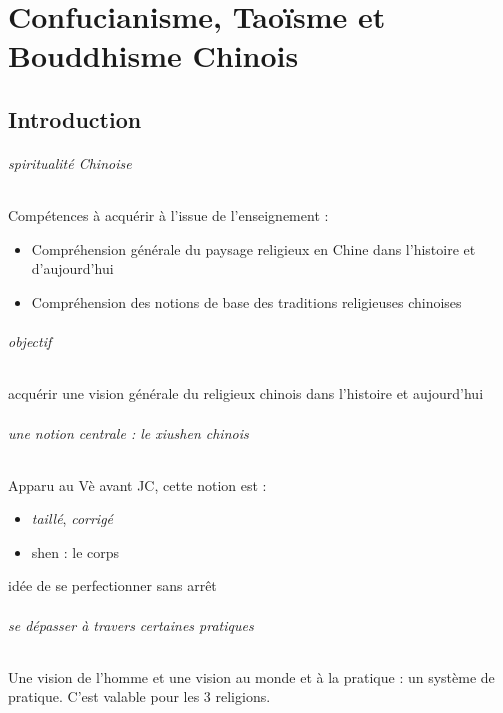 \part{Confucianisme, Taoïsme et Bouddhisme Chinois}
\chapter{Introduction}


\paragraph{spiritualité Chinoise}
Compétences à acquérir à l’issue de l’enseignement :
\begin{itemize}
    \item 	Compréhension générale du paysage religieux en Chine dans l’histoire et d’aujourd’hui
\item 	Compréhension des notions de base des traditions religieuses chinoises
\end{itemize}


\paragraph{objectif } acquérir une vision générale du religieux chinois dans l'histoire et aujourd'hui


\paragraph{une notion centrale : le xiushen chinois}

\begin{Def}[xiushen]
    Apparu au Vè avant JC, cette notion est :
    \begin{itemize}
        \item \textit{taillé}, \textit{corrigé}
        \item shen : le corps
    \end{itemize}
    idée de se perfectionner sans arrêt
\end{Def}

\paragraph{se dépasser à travers certaines pratiques}
Une vision de l'homme et une vision au monde et à la pratique : un système de pratique. C'est valable pour les 3 religions. 

